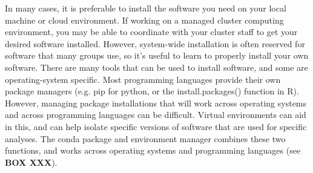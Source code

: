 \documentclass[10pt,letterpaper]{article}
\begin{document}
In many cases, it is preferable to install the software you need on your local machine or cloud environment. If working on a managed cluster computing environment, you may be able to coordinate with your cluster staff to get your desired software installed. However, system-wide installation is often reserved for software that many groups use, so it’s useful to learn to properly install your own software. There are many tools that can be used to install software, and some are operating-system specific. Most programming languages provide their own package managers (e.g. pip for python, or the install.packages() function in R). However, managing package installations that will work across operating systems and across programming languages can be difficult. Virtual environments can aid in this, and can help isolate specific versions of software that are used for specific analyses. The conda package and environment manager combines these two functions, and works across operating systems and programming languages (see \textbf{BOX XXX}). 
\end{document}
